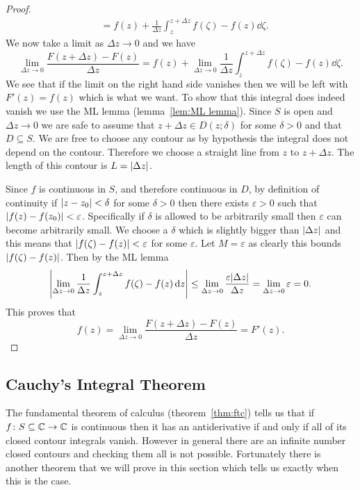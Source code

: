 \documentclass{article}
\newcommand{\discOpen}[2]{D\left({#1}; {#2}\right)}
\begin{document}
\begin{proof}
\begin{align*}
            &= f(z) + \frac{1}{\Delta z} \int_{z}^{z + \Delta z} f(\zeta) - f(z)\dd{\zeta}.
        \end{align*}
        We now take a limit as \(\Delta z \to 0\) and we have
        \[\lim_{\Delta z \to 0} \frac{F(z + \Delta z) - F(z)}{\Delta z} = f(z) + \lim_{\Delta z\to 0} \frac{1}{\Delta z}\int_{z}^{z + \Delta z} f(\zeta) - f(z)\dd{\zeta}.\]
        We see that if the limit on the right hand side vanishes then we will be left with \(F'(z) = f(z)\) which is what we want.
        To show that this integral does indeed vanish we use the ML lemma (lemma~\ref{lem:ML lemma}).
        Since \(S\) is open and \(\Delta z \to 0\) we are safe to assume that \(z + \Delta z\in \discOpen{z}{\delta}\) for some \(\delta > 0\) and that \(D\subseteq S\).
        We are free to choose any contour as by hypothesis the integral does not depend on the contour.
        Therefore we choose a straight line from \(z\) to \(z + \Delta z\).
        The length of this contour is \(L = \abs{\Delta z}\).
        
        Since \(f\) is continuous in \(S\), and therefore continuous in \(D\), by definition of continuity if \(\abs{z - z_0} < \delta\) for some \(\delta > 0\) then there exists \(\varepsilon>0\) such that \(\abs{f(z) - f(z_0)} < \varepsilon\).
        Specifically if \(\delta\) is allowed to be arbitrarily small then \(\varepsilon\) can become arbitrarily small.
        We choose a \(\delta\) which is slightly bigger than \(\abs{\Delta z}\) and this means that \(\abs{f(\zeta) - f(z)} < \varepsilon\) for some \(\varepsilon\).
        Let \(M = \varepsilon\) as clearly this bounds \(\abs{f(\zeta) - f(z)}\).
        Then by the ML lemma
        \[\abs{\lim_{\Delta z\to 0} \frac{1}{\Delta z} \int_z^{z + \Delta z} f(\zeta) - f(z)\dd{z}} \le \lim_{\Delta z\to 0}\frac{\varepsilon\abs{\Delta z}}{\Delta z} = \lim_{\Delta z\to 0}\varepsilon = 0.\]
        This proves that
        \[f(z) = \lim_{\Delta z\to 0} \frac{F(z + \Delta z) - F(z)}{\Delta z} = F'(z).\]
    \end{proof}
    
    \subsection{Cauchy's Integral Theorem}
    The fundamental theorem of calculus (theorem~\ref{thm:ftc}) tells us that if \(f\colon S\subseteq\mathbb{C}\to\mathbb{C}\) is continuous then it has an antiderivative if and only if all of its closed contour integrals vanish.
    However in general there are an infinite number closed contours and checking them all is not possible.
    Fortunately there is another theorem that we will prove in this section which tells us exactly when this is the case.
    
\end{document}
